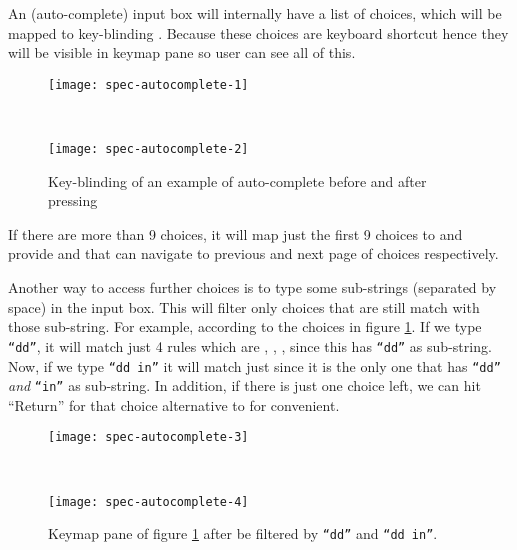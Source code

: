 \documentclass[master.tex]{subfiles}
\begin{document}
An (auto-complete) input box will internally have a list of choices, which will
be mapped to key-blinding . Because these choices are keyboard
shortcut hence they will be visible in keymap pane so user can see all of this.

\begin{figure}[H]
    \centering

\begin{minipage}{0.40\textwidth}
\begin{flushleft}
    \texttt{[image: spec-autocomplete-1]}
\end{flushleft}
\end{minipage}
~
\begin{minipage}{0.40\textwidth}
\begin{flushright}
    \texttt{[image: spec-autocomplete-2]}
\end{flushright}
\end{minipage}
\caption{Key-blinding of an example of auto-complete before and after pressing \pkbd{Alt-]}}
\label{fig:specification-autocomplete-choices}
\end{figure}
If there are more than 9 choices, it will map just the first 9 choices to
 and provide \pkbd{Alt-[} and \pkbd{Alt-]} that can navigate to
previous and next page of choices respectively.

Another way to access further choices is to type some sub-strings (separated by
space) in the input box. This will filter only choices that are still match with
those sub-string. For example, according to the choices in figure
\ref{fig:specification-autocomplete-choices}. If we type \texttt{``dd''}, it
will match just 4 rules which are , ,
,  since this has \texttt{``dd''} as
sub-string. Now, if we type \texttt{``dd in''} it will match just
 since it is the only one that has \texttt{``dd''} \emph{and}
\texttt{``in''} as sub-string. In addition, if there is just one choice left, we
can hit ``Return'' for that choice alternative to  for convenient.

\begin{figure}[H]
    \centering

\begin{minipage}{0.40\textwidth}
\begin{flushleft}
    \texttt{[image: spec-autocomplete-3]}
\end{flushleft}
\end{minipage}
~
\begin{minipage}{0.40\textwidth}
\begin{flushright}
    \texttt{[image: spec-autocomplete-4]}
\end{flushright}
\end{minipage}
\caption{Keymap pane of figure \ref{fig:specification-autocomplete-choices}
  after be filtered by \texttt{``dd''} and \texttt{``dd in''}.}
\label{fig:specification-autocomplete-choices-filtered}
\end{figure}
\end{document}
